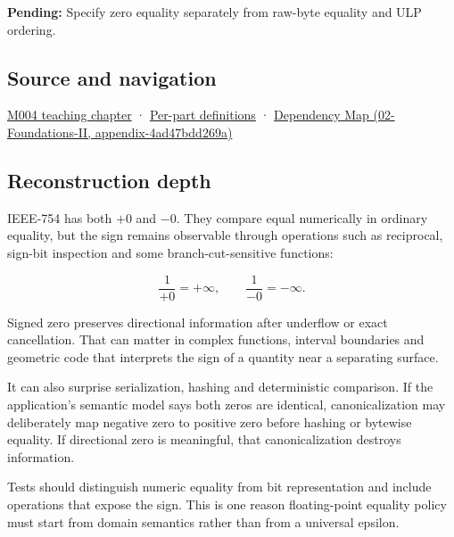 \textbf{Pending:} Specify zero equality separately from raw-byte equality and ULP ordering.

\subsection{Source and navigation}\label{appendix-3a048f032c1f-source-and-navigation}

\hyperref[01-foundations-i-ch001-a-stretching-ruler-for-real-valued-quantities]{M004 teaching chapter} · \hyperref[appendix-fd090d982a15-m004---parts-61-76]{Per-part definitions} · \href{../02-Foundations-II/main.pdf\#nameddest=appendix-4ad47bdd269a}{Dependency Map (02-Foundations-II, appendix-4ad47bdd269a)}

\subsection{Reconstruction depth}\label{appendix-3a048f032c1f-reconstruction-depth}

IEEE-754 has both \(+0\) and \(-0\). They compare equal numerically in ordinary equality, but the sign remains observable through operations such as reciprocal, sign-bit inspection and some branch-cut-sensitive functions:

\[
\frac{1}{+0}=+\infty,
\qquad
\frac{1}{-0}=-\infty.
\]

Signed zero preserves directional information after underflow or exact cancellation. That can matter in complex functions, interval boundaries and geometric code that interprets the sign of a quantity near a separating surface.

It can also surprise serialization, hashing and deterministic comparison. If the application's semantic model says both zeros are identical, canonicalization may deliberately map negative zero to positive zero before hashing or bytewise equality. If directional zero is meaningful, that canonicalization destroys information.

Tests should distinguish numeric equality from bit representation and include operations that expose the sign. This is one reason floating-point equality policy must start from domain semantics rather than from a universal epsilon.
